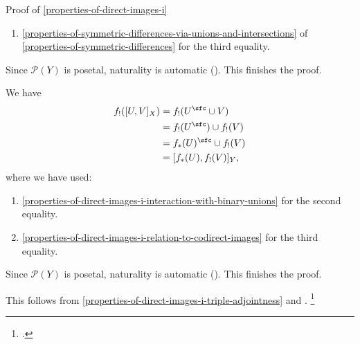 \begin{Proof}{Proof of \cref{properties-of-direct-images-i}}
\begin{enumerate}
        \item\label{proof-of-properties-of-direct-images-i-interaction-with-symmetric-differences-of-5}\cref{properties-of-symmetric-differences-via-unions-and-intersections} of \cref{properties-of-symmetric-differences} for the third equality.
    \end{enumerate}
    Since $\mathcal{P}(Y)$ is posetal, naturality is automatic (). This finishes the proof.

    We have
    \begin{align*}
        f_{!}([U,V]_{X}) &= f_{!}(U^{\sfc}\cup V)\\
                         &= f_{!}(U^{\sfc})\cup f_{!}(V)\\
                         &= f_{*}(U)^{\sfc}\cup f_{!}(V)\\
                         &= [f_{*}(U),f_{!}(V)]_{Y},%
    \end{align*}
    where we have used:
    \begin{enumerate}
        \item\label{proof-of-properties-of-direct-images-i-interaction-with-internal-homs-of-powersets-1}\cref{properties-of-direct-images-i-interaction-with-binary-unions} for the second equality.
        \item\label{proof-of-properties-of-direct-images-i-interaction-with-internal-homs-of-powersets-2}\cref{properties-of-direct-images-i-relation-to-codirect-images} for the third equality.
    \end{enumerate}
    Since $\mathcal{P}(Y)$ is posetal, naturality is automatic (). This finishes the proof.

    This follows from \cref{properties-of-direct-images-i-triple-adjointness} and .%
    \footnote{%
        \cite{proof-wiki:image-of-union-under-mapping}.
        \par\vspace*{\TCBBoxCorrection}
    }%


\end{Proof}
